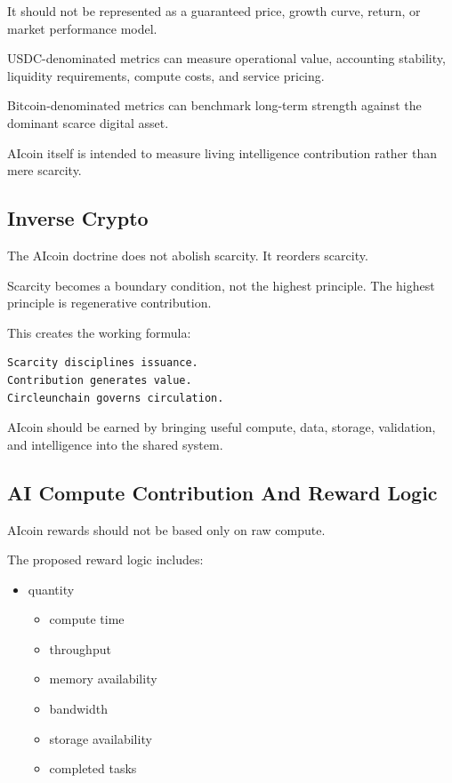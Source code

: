 ﻿\documentclass[12pt]{article}
\begin{document}
It should not be represented as a guaranteed price, growth curve, return, or market performance model.

USDC-denominated metrics can measure operational value, accounting stability, liquidity requirements, compute costs, and service pricing.

Bitcoin-denominated metrics can benchmark long-term strength against the dominant scarce digital asset.

AIcoin itself is intended to measure living intelligence contribution rather than mere scarcity.

\subsection{Inverse Crypto}


The AIcoin doctrine does not abolish scarcity. It reorders scarcity.

Scarcity becomes a boundary condition, not the highest principle. The highest principle is regenerative contribution.

This creates the working formula:

\begin{verbatim}
Scarcity disciplines issuance.
Contribution generates value.
Circleunchain governs circulation.
\end{verbatim}

AIcoin should be earned by bringing useful compute, data, storage, validation, and intelligence into the shared system.

\subsection{AI Compute Contribution And Reward Logic}


AIcoin rewards should not be based only on raw compute.

The proposed reward logic includes:

\begin{itemize}
  \item quantity
\begin{itemize}
  \item compute time
\end{itemize}
\begin{itemize}
  \item throughput
\end{itemize}
\begin{itemize}
  \item memory availability
\end{itemize}
\begin{itemize}
  \item bandwidth
\end{itemize}
\begin{itemize}
  \item storage availability
\end{itemize}
\begin{itemize}
  \item completed tasks
\end{itemize}
\end{itemize}
\end{document}
